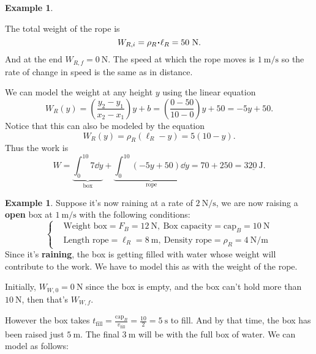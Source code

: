 \documentclass[12pt]{article}
\theoremstyle{plain}
\theoremstyle{definition}
\newtheorem{Ex}[Th]{Example}           %
\theoremstyle{remark}
\renewcommand{\l}{\ell}
\renewcommand{\:}{\colon}           %
\newcommand{\un}[1]{\underline{#1}}
\renewcommand{\.}{\Cdot}                %
\begin{document}
\begin{multicols}{2}
\begin{Ex}
\begin{center}

\end{center}
The total weight of the rope is
 $$W_{R,i}=\rho_R\.\l_R=50\ \si\newton.$$ 
 And at the end $W_{R,f}=0\ \si\newton$. The speed at which the rope moves is $1\ \si{\metre\per\second}$ so the rate of change in speed is the same as in distance.\par
 We can model the weight at any height $y$ using the linear equation
$$W_R(y)=\left(\frac{y_2-y_1}{x_2-x_1}\right)y+b=\left(\frac{0-50}{10-0}\right)y+50=-5y+50.$$
Notice that this can also be modeled by the equation
$$W_R(y)=\rho_R(\l_R-y)=5(10-y).$$
Thus the work is 
$$W=\underbrace{\int_0^{10} 7\dd y}_{\text{box}}+\underbrace{\int_0^{10}(-5y+50)\dd y}_{\text{rope}}=70+250=\un{320\ \si\joule}.$$
\end{Ex}
\vspace*{-1.2em}
\begin{Ex}
  Suppose it's now raining at a rate of $2\ \si{\newton\per\second}$, we are now raising a \textbf{open} box at $1\ \si{\metre\per\second}$ with the following conditions:
  $$
  \left\lbrace
  \begin{aligned}
    &\text{Weight box}=F_B=12\ \si\newton,\ \text{Box capacity}=\text{cap}_B=10\ \si\newton\\
    &\text{Length rope}=\l_R=8\ \si\metre,\ \text{Density rope}=\rho_R=4\ \si{\newton\per\metre}
  \end{aligned}
  \right.
  $$
Since it's \textbf{raining}, the box is getting filled with water whose weight will contribute to the work. We have to model this as with the weight of the rope.\par 
Initially, $W_{W,0}=0\ \si\newton$ since the box is empty, and the box can't hold more than $10\ \si\newton$, then that's $W_{W,f}$.\par 
However the box takes $t_{\text{fill}}=\frac{\text{cap}_B}{v_{\text{fill}}}=\frac{10}{2}=5\ \si\second$ to fill. And by that time, the box has been raised just $5\ \si\metre$. The final $3\ \si\metre$ will be with the full box of water. We can model as follows:
\begin{center}


\end{center}
\end{Ex}
\end{multicols}
\end{document}
